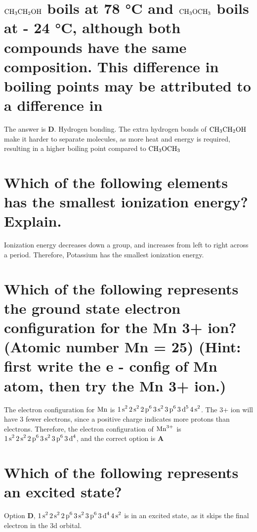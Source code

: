 \documentclass[11pt]{article}
\begin{document}
\section{\(\ce{CH3CH2OH}\) boils at 78 °C and \(\ce{CH3OCH3}\) boils at - 24 °C, although both compounds have the same composition. This difference in boiling points may be attributed to a difference in}
\label{sec:org7ed59eb}
The answer is \textbf{D}. Hydrogen bonding. The extra hydrogen bonds of \(\ce{CH3CH2OH}\) make it harder to separate molecules, as more heat and energy is required, resulting in a higher boiling point compared to \(\ce{CH3OCH3}\)

\section{Which of the following elements has the smallest ionization energy? Explain.}
\label{sec:orgb48c458}
Ionization energy decreases down a group, and increases from left to right across a period. Therefore, Potassium has the smallest ionization energy.

\section{Which of the following represents the ground state electron configuration for the Mn 3+ ion? (Atomic number Mn = 25) (Hint: first write the e - config of Mn atom, then try the Mn 3+ ion.)}
\label{sec:org4d613a6}
The electron configuration for \(\ce{Mn}\) is \(\ce{1s^2 2s^2 2p^6 3s^2 3p^6 3d^5 4s^2}\). The 3+ ion will have 3 fewer electrons, since a positive charge indicates more protons than electrons. Therefore, the electron configuration of \(\ce{Mn^{3+}}\) is \(\ce{1s^2 2s^2 2p^6 3s^2 3p^6 3d^4}\), and the correct option is \textbf{A}

\section{Which of the following represents an excited state?}
\label{sec:org50c7427}
Option \textbf{D}, \(\ce{1s^2 2s^2 2p^6 3s^2 3p^6 3d^4 4s^2}\) is in an excited state, as it skips the final electron in the 3d orbital.
\end{document}
